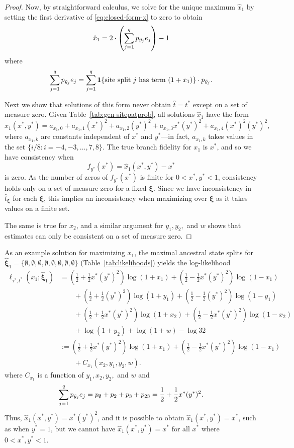\begin{proof}
Now, by straightforward calculus, we solve for the unique maximum $\hat{x}_1$ by setting the first derivative of \eqref{eq:closed-form-x} to zero to obtain
\[
\hat{x}_1 = 2\cdot\left(\sum_{j=1}^q p_{\tilde{y}_j}e_j\right) - 1
\]
where
\[
\sum_{j=1}^q p_{\tilde{y}_j}e_j = \sum_{j=1}^q \mathbf{1}\{\mbox{site split $j$ has term $(1+x_1)$}\} \cdot p_{\tilde{y}_j}.
\]


Next we show that solutions of this form never obtain $\hat{t} = t^*$ except on a set of measure zero.
Given Table~\ref{tab:gen-sitepatprob}, all solutions $\hat{x}_1$ have the form
\[
\hat{x}_1(x^*,y^*) = a_{x_1,0} + a_{x_1,1}(x^*)^2 + a_{x_1,2}(y^*)^2 + a_{x_1,3} x^*(y^*)^2 + a_{x_1,4}(x^*)^2(y^*)^2,
\]
where $a_{x_1,k}$ are constants independent of $x^*$ and $y^*$---in fact, $a_{x_1,k}$ takes values in the set $\{i/8 : i=-4,-3,\ldots,7,8\}$.
The true branch fidelity for $x_1$ is $x^*$, and so we have consistency when
\[
f_{y^*}(x^*) = \hat{x}_1(x^*,y^*) - x^*
\]
is zero.
As the number of zeros of $f_{y^*}(x^*)$ is finite for $0 < x^*, y^* < 1$, consistency holds only on a set of measure zero for a fixed $\boldsymbol\xi$.
Since we have inconsistency in $\hat{t}_{\boldsymbol\xi}$ for each $\boldsymbol\xi$, this implies an inconsistency when maximizing over $\boldsymbol\xi$ as it takes values on a finite set.

The same is true for $x_2$, and a similar argument for $y_1,y_2,$ and $w$ shows that estimates can only be consistent on a set of measure zero.

\end{proof}

As an example solution for maximizing $x_1$, the maximal ancestral state splits for $\hat{\boldsymbol\xi}_1 = \{\emptyset,\emptyset,\emptyset,\emptyset,\emptyset,\emptyset,\emptyset,\emptyset\}$ (Table~\ref{tab:likelihoods}) yields the log-likelihood
\begin{align*}
\ell_{\tau^*,t^*}(x_1; \hat{\boldsymbol\xi}_1) &= \left(\frac{1}{2}+\frac{1}{2}x^*(y^*)^2\right)\log(1+x_1) + \left(\frac{1}{2}-\frac{1}{2}x^*(y^*)^2\right)\log(1-x_1)\\
&\qquad + \left(\frac{1}{2}+\frac{1}{2}(y^*)^2\right)\log(1+y_1) + \left(\frac{1}{2}-\frac{1}{2}(y^*)^2\right)\log(1-y_1)\\
&\qquad + \left(\frac{1}{2}+\frac{1}{2}x^*(y^*)^2\right)\log(1+x_2) + \left(\frac{1}{2}-\frac{1}{2}x^*(y^*)^2\right)\log(1-x_2)\\
&\qquad + \log(1+y_2) + \log(1+w) - \log 32\\
&:= \left(\frac{1}{2}+\frac{1}{2}x^*(y^*)^2\right)\log(1+x_1) + \left(\frac{1}{2}-\frac{1}{2}x^*(y^*)^2\right)\log(1-x_1)\\
&\qquad + C_{x_1}(x_2,y_1,y_2,w).
\end{align*}
where $C_{x_1}$ is a function of $y_1,x_2,y_2,$ and $w$ and
\[
\sum_{j=1}^q p_{\tilde{y}_j}e_j = p_{\emptyset} + p_2 + p_3 + p_{23} = \frac{1}{2} + \frac{1}{2}x^*(y^*)^2.
\]
Thus, $\hat{x}_1(x^*, y^*) = x^*(y^*)^2$, and it is possible to obtain $\hat{x}_1(x^*,y^*)=x^*$, such as when $y^*=1$, but we cannot have $\hat{x}_1(x^*,y^*)=x^*$ for all $x^*$ where $0 < x^*, y^* < 1$.


